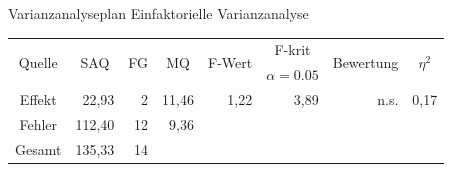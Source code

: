 \documentclass{beamer}
\begin{document}
	\begin{frame}{Varianzanalyseplan}
		Einfaktorielle Varianzanalyse\\
		\begin{table}[]
			\centering
			\resizebox{\textwidth}{!} {
			\begin{tabular}{|c|r|r|r|r|r|r|r|}
				\hline
				\multirow{2}{*}{Quelle} & \multicolumn{1}{c|}{\multirow{2}{*}{SAQ}} & \multicolumn{1}{c|}{\multirow{2}{*}{FG}} & \multicolumn{1}{c|}{\multirow{2}{*}{MQ}} & \multicolumn{1}{c|}{\multirow{2}{*}{F-Wert}} & \multicolumn{1}{c|}{F-krit}        & \multicolumn{1}{c|}{\multirow{2}{*}{Bewertung}} & \multicolumn{1}{c|}{\multirow{2}{*}{$\eta^2$}} \\
				& \multicolumn{1}{c|}{}                     & \multicolumn{1}{c|}{}                    & \multicolumn{1}{c|}{}                    & \multicolumn{1}{c|}{}                        & \multicolumn{1}{c|}{$\alpha=0.05$} & \multicolumn{1}{c|}{}                           & \multicolumn{1}{c|}{}                          \\ \hline
				Effekt                  & 22,93                                     & 2                                        & 11,46                                    & 1,22                                         & 3,89                               & n.s.                                            & 0,17                                           \\ \hline
				Fehler                  & 112,40                                    & 12                                       & 9,36                                     &                                              &                                    &                                                 &                                                \\ \hline
				Gesamt                  & 135,33                                    & 14                                       &                                          &                                              &                                    &                                                 &                                                \\ \hline
			\end{tabular}
		}
		\end{table}
		
	\end{frame}
	
\end{document}
